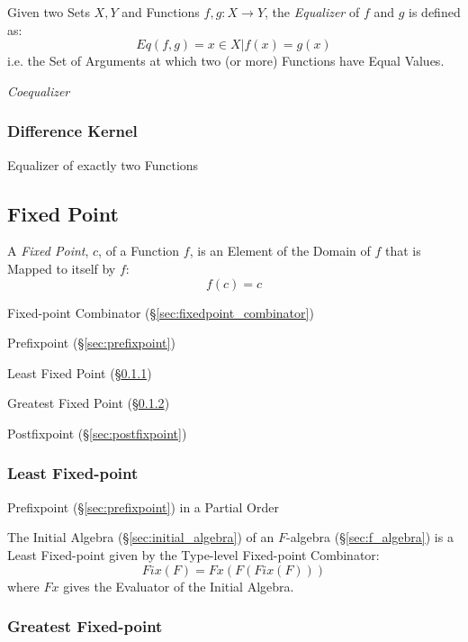 Given two Sets $X,Y$ and Functions $f,g : X \rightarrow Y$, the
\emph{Equalizer} of $f$ and $g$ is defined as:
\[
  Eq(f,g) = { x \in X | f(x) = g(x) }
\]
i.e. the Set of Arguments at which two (or more) Functions have Equal
Values.


\emph{Coequalizer}



\subsubsection{Difference Kernel}\label{sec:difference_equalizer}

Equalizer of exactly two Functions



\subsection{Fixed Point}\label{sec:fixed_point}

A \emph{Fixed Point}, $c$, of a Function $f$, is an Element of the
Domain of $f$ that is Mapped to itself by $f$:
\[
  f(c) = c
\]

Fixed-point Combinator (\S\ref{sec:fixedpoint_combinator})

Prefixpoint (\S\ref{sec:prefixpoint})

Least Fixed Point (\S\ref{sec:least_fixedpoint})

Greatest Fixed Point (\S\ref{sec:greatest_fixedpoint})

Postfixpoint (\S\ref{sec:postfixpoint})



\subsubsection{Least Fixed-point}\label{sec:least_fixedpoint}

Prefixpoint (\S\ref{sec:prefixpoint}) in a Partial Order

The Initial Algebra (\S\ref{sec:initial_algebra}) of an $F$-algebra
(\S\ref{sec:f_algebra}) is a Least Fixed-point given by the Type-level
Fixed-point Combinator:
\[
  Fix (F) = Fx(F (Fix (F)))
\]
where $Fx$ gives the Evaluator of the Initial Algebra.



\subsubsection{Greatest Fixed-point}\label{sec:greatest_fixedpoint}


